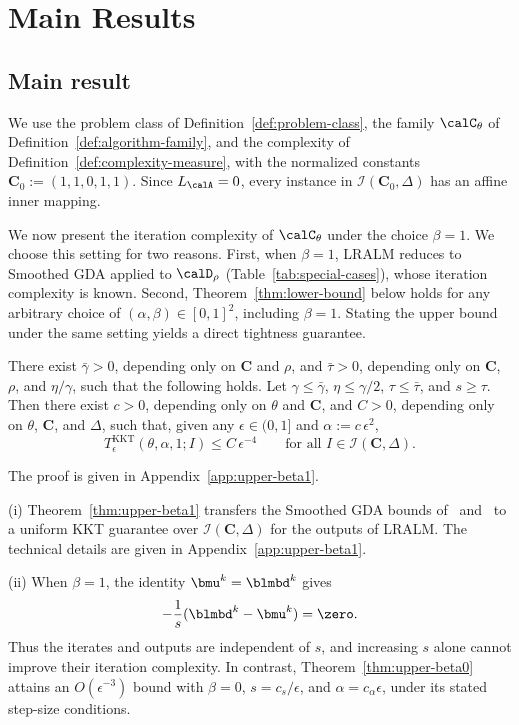 \section{Main Results}
\label{sec:lower-bound}

\subsection{Main result}
\label{subsec:lb-main}

We use the problem class of Definition~\ref{def:problem-class}, the family
\(\calC_\theta\) of Definition~\ref{def:algorithm-family}, and the complexity
of Definition~\ref{def:complexity-measure}, with the normalized constants
\(\mathbf C_0:=(1,1,0,1,1)\). Since \(L_{\calA}=0\), every instance in
\(\mathcal I(\mathbf C_0,\Delta)\) has an affine inner mapping.

We now present the iteration complexity of \(\calC_\theta\) under the choice
\(\beta=1\). We choose this setting for two reasons. First, when
\(\beta=1\), LRALM reduces to Smoothed GDA applied to \(\calD_\rho\)
(Table~\ref{tab:special-cases}), whose iteration complexity is known. Second,
Theorem~\ref{thm:lower-bound} below holds for any arbitrary choice of
\((\alpha,\beta)\in[0,1]^2\), including \(\beta=1\). Stating the upper bound
under the same setting yields a direct tightness guarantee.

\begin{theorem}[Iteration complexity of LRALM with \(\beta=1\)]
\label{thm:upper-beta1}
There exist \(\bar\gamma>0\), depending only on \(\mathbf C\) and \(\rho\),
and \(\bar\tau>0\), depending only on \(\mathbf C\), \(\rho\), and
\(\eta/\gamma\), such that the following holds. Let \(\gamma\le\bar\gamma\),
\(\eta\le\gamma/2\), \(\tau\le\bar\tau\), and \(s\ge\tau\). Then there exist
\(c>0\), depending only on \(\theta\) and \(\mathbf C\), and \(C>0\),
depending only on \(\theta\), \(\mathbf C\), and \(\Delta\), such that, given
any \(\epsilon\in(0,1]\) and \(\alpha:=c\,\epsilon^2\),
\[
T^{\mathrm{KKT}}_\epsilon(\theta,\alpha,1;I)\le C\,\epsilon^{-4}
\qquad\text{for all } I\in\mathcal I(\mathbf C,\Delta).
\]
\end{theorem}
The proof is given in Appendix~\ref{app:upper-beta1}.

\begin{remark}
\label{rem:upper-beta1}
(i) Theorem~\ref{thm:upper-beta1} transfers the Smoothed GDA bounds
of~\cite[Theorem~3.4]{zhang2020smoothed}
and~\cite[Theorem~B.1]{li2026smoothing} to a uniform KKT guarantee over
\(\mathcal I(\mathbf C,\Delta)\) for the outputs of LRALM.
The technical details are given in Appendix~\ref{app:upper-beta1}.

(ii) When \(\beta=1\), the identity \(\bmu^k=\blmbd^k\) gives
\[
    -\frac{1}{s}(\blmbd^k-\bmu^k)=\zero.
\]
Thus the iterates and outputs are independent of \(s\), and increasing
\(s\) alone cannot improve their iteration complexity. In contrast,
Theorem~\ref{thm:upper-beta0} attains an \(O(\epsilon^{-3})\) bound with
\(\beta=0\), \(s=c_s/\epsilon\), and \(\alpha=c_\alpha\epsilon\),
under its stated step-size conditions.
\end{remark}


